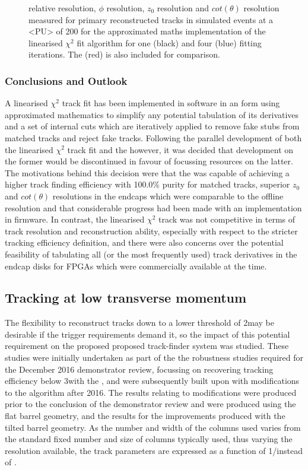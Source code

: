 \begin{figure}[htb]
\caption{
\pt relative resolution, $\phi$ resolution, $z_{0}$ resolution and $cot(\theta)$ resolution measured for primary reconstructed tracks in simulated \ttbar events at a <PU> of 200 for the approximated maths implementation of the linearised $\chi^{2}$ fit algorithm for one (black) and four (blue) fitting iterations. The \KF (red) is also included for comparison.
}
\label{fig:chi2HelixParametersResIterationsComparison}
\end{figure}

\subsubsection{Conclusions and Outlook}\label{subsubsec:chi2outlook}
A linearised $\chi^{2}$ track fit has been implemented in software in an form using approximated mathematics to simplify any potential tabulation of its derivatives and a set of internal cuts which are iteratively applied to remove fake stubs from matched tracks and reject fake tracks.
Following the parallel development of both the linearised $\chi^{2}$ track fit and the \KF however, it was decided that development on the former would be discontinued in favour of focussing resources on the latter.
The motivations behind this decision were that the \KF was capable of achieving a higher track finding efficiency with 100.0\% purity for matched tracks, superior $z_{0}$ and $cot(\theta)$ resolutions in the endcaps which were comparable to the offline resolution and that considerable progress had been made with an implementation in firmware.
In contrast, the linearised $\chi^{2}$ track was not competitive in terms of track resolution and reconstruction ability, especially with respect to the stricter tracking efficiency definition, and there were also concerns over the potential feasibility of tabulating all (or the most frequently used) track derivatives in the endcap disks for FPGAs which were commercially available at the time.

\subsection{Tracking at low transverse momentum}\label{subsec:Tmtt2GeV}
The flexibility to reconstruct tracks down to a lower \pT threshold of 2\GeV may be desirable if the trigger requirements demand it, so the impact of this potential requirement on the proposed proposed track-finder system was studied.
These studies were initially undertaken as part of the the robustness studies required for the December 2016 demonstrator review, focussing on recovering tracking efficiency below 3\GeV with the \HT, and were subsequently built upon with modifications to the \KF algorithm after 2016.
The results relating to \HT modifications were produced prior to the conclusion of the demonstrator review and were produced using the flat barrel geometry, and the results for the \KF improvements produced with the tilted barrel geometry.
As the number and width of the \qpt \HT columns used varies from the standard fixed number and size of columns typically used, thus varying the \pT resolution available, the track parameters are expressed as a function of 1/\pT instead of \pT.

